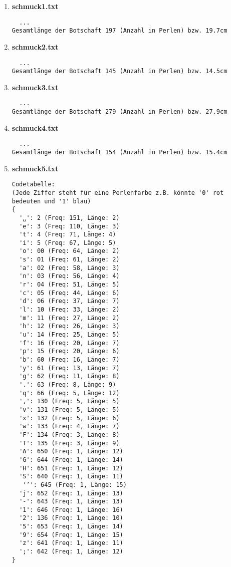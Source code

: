 \documentclass[a4paper,10pt,ngerman]{scrartcl}
\begin{document}
\begin{enumerate}
  \item \textbf{schmuck1.txt}
\begin{verbatim}
  ...
Gesamtlänge der Botschaft 197 (Anzahl in Perlen) bzw. 19.7cm
\end{verbatim}
  \item \textbf{schmuck2.txt}
\begin{verbatim}
  ...
Gesamtlänge der Botschaft 145 (Anzahl in Perlen) bzw. 14.5cm
\end{verbatim}
  \item \textbf{schmuck3.txt}
\begin{verbatim}
  ...
Gesamtlänge der Botschaft 279 (Anzahl in Perlen) bzw. 27.9cm
\end{verbatim}
  \item \textbf{schmuck4.txt}
\begin{verbatim}
  ...
Gesamtlänge der Botschaft 154 (Anzahl in Perlen) bzw. 15.4cm
\end{verbatim}
  \item \textbf{schmuck5.txt}
\begin{verbatim}
Codetabelle:
(Jede Ziffer steht für eine Perlenfarbe z.B. könnte '0' rot bedeuten und '1' blau)
{
  '␣': 2 (Freq: 151, Länge: 2)
  'e': 3 (Freq: 110, Länge: 3)
  't': 4 (Freq: 71, Länge: 4)
  'i': 5 (Freq: 67, Länge: 5)
  'o': 00 (Freq: 64, Länge: 2)
  's': 01 (Freq: 61, Länge: 2)
  'a': 02 (Freq: 58, Länge: 3)
  'n': 03 (Freq: 56, Länge: 4)
  'r': 04 (Freq: 51, Länge: 5)
  'c': 05 (Freq: 44, Länge: 6)
  'd': 06 (Freq: 37, Länge: 7)
  'l': 10 (Freq: 33, Länge: 2)
  'm': 11 (Freq: 27, Länge: 2)
  'h': 12 (Freq: 26, Länge: 3)
  'u': 14 (Freq: 25, Länge: 5)
  'f': 16 (Freq: 20, Länge: 7)
  'p': 15 (Freq: 20, Länge: 6)
  'b': 60 (Freq: 16, Länge: 7)
  'y': 61 (Freq: 13, Länge: 7)
  'g': 62 (Freq: 11, Länge: 8)
  '.': 63 (Freq: 8, Länge: 9)
  'q': 66 (Freq: 5, Länge: 12)
  ',': 130 (Freq: 5, Länge: 5)
  'v': 131 (Freq: 5, Länge: 5)
  'x': 132 (Freq: 5, Länge: 6)
  'w': 133 (Freq: 4, Länge: 7)
  'F': 134 (Freq: 3, Länge: 8)
  'T': 135 (Freq: 3, Länge: 9)
  'A': 650 (Freq: 1, Länge: 12)
  'G': 644 (Freq: 1, Länge: 14)
  'H': 651 (Freq: 1, Länge: 12)
  'S': 640 (Freq: 1, Länge: 11)
   '’': 645 (Freq: 1, Länge: 15)
  'j': 652 (Freq: 1, Länge: 13)
  '-': 643 (Freq: 1, Länge: 13)
  '1': 646 (Freq: 1, Länge: 16)
  '2': 136 (Freq: 1, Länge: 10)
  '5': 653 (Freq: 1, Länge: 14)
  '9': 654 (Freq: 1, Länge: 15)
  'z': 641 (Freq: 1, Länge: 11)
  ';': 642 (Freq: 1, Länge: 12)
}


\end{verbatim}
\end{enumerate}
\end{document}
